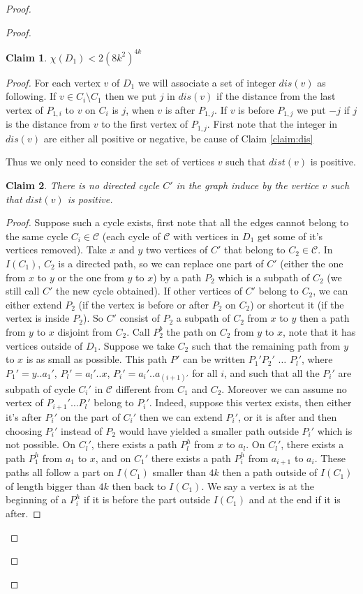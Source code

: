 \documentclass[utf8,10pt]{article}
\theoremstyle{plain}
\newtheorem{claim}{Claim}[theorem]
\theoremstyle{definition}
\theoremstyle{remark}
\begin{document}
\begin{proof}
\begin{proof}
\begin{claim}
$\chi(D_1) <  2(8k^2)^{4k}$
\end{claim}

\begin{proof}
For each vertex $v$ of $D_1$ we will associate a set of integer $dis(v)$ as following.
If $v \in C_i \setminus C_1$ then we put $j$ in $dis(v)$ if the distance
from the last vertex of $P_{1,i}$ to $v$ on $C_i$ is $j$, when $v$ is after $P_{1,j}$.
If $v$ is before $P_{1,j}$ we put $-j$ if $j$ is the distance from $v$ to the first vertex of $P_{1,j}$.
First note that the integer in $dis(v)$ are either all positive or negative, be cause of Claim \ref{claim:dis}

Thus we only need to consider the set of vertices $v$ such that $dist(v)$ is positive.
\begin{claim}\label{CycleDis}
There is no directed cycle $C'$ in the graph induce by the vertice $v$ such that $dist(v)$ is positive.
\end{claim}

\begin{proof}
Suppose such a cycle exists, first note that all the edges cannot belong to the same cycle $C_i \in \mathcal{C}$
(each cycle of $\mathcal{C}$ with vertices in $D_1$ get some of it's vertices removed).
Take $x$ and $y$ two vertices of $C'$ that belong to $C_2 \in \mathcal{C}$. In $I(C_1)$, $C_2$ is a directed path,
so we can replace one part of $C'$ (either the one from $x$ to $y$ or the one from $y$ to $x$) by a path $P_2$
 which is a subpath of $C_2$ (we still call $C'$ the new cycle obtained).
If other vertices of $C'$ belong to $C_2$, we can either extend
$P_2$ (if the vertex is before or after $P_2$ on $C_2$)
or shortcut it (if the vertex is inside $P_2$). So $C'$ consist of $P_2$ a subpath of
$C_2$ from $x$ to $y$ then a path from $y$ to $x$ disjoint from $C_2$.
Call $P_2^b$ the path on $C_2$ from $y$ to $x$, note that it has vertices outside of $D_1$.
Suppose we take $C_2$ such that the remaining path from $y$ to $x$ is as small as possible.
This path $P'$ can be written $P_1'P_2'$ $\dots$ $P_l'$, where $P_1' = y..a_1'$,
$P_l' = a_l' ..x$, $P_i' = a_i'..a_{(i+1)'}$ for all $i$, and such that all
the $P_i'$ are subpath of cycle $C_i'$ in $\mathcal{C}$ different from $C_1$ and $C_2$.
Moreover we can assume no vertex of $P_{i+1}' \dots P_l'$ belong to $P_i'$. Indeed, suppose this vertex
exists, then either it's after $P_i'$ on the part of $C_i'$ then we can extend $P_i'$, or it is after and then
choosing $P_i'$ instead of $P_2$ would have yielded a smaller path outside $P_i'$ which is not possible.
On $C_l'$, there exists a path $P_l^h$ from $x$ to $a_l$. On $C_l'$, there exists a path $P_1^h$ from $a_1$ to $x$, and
on $C_1'$ there exists a path $P_i^h$ from $a_{i+1}$ to $a_i$. These paths all follow a part
on $I(C_1)$ smaller than $4k$ then a path outside of $I(C_1)$ of length bigger than
$4k$ then back to $I(C_1)$. We say a vertex is at the beginning of a $P_i^h$ if it is
before the part outside $I(C_1)$ and at the end if it is after.


\end{proof}
\end{proof}
\end{proof}
\end{proof}
\end{document}
